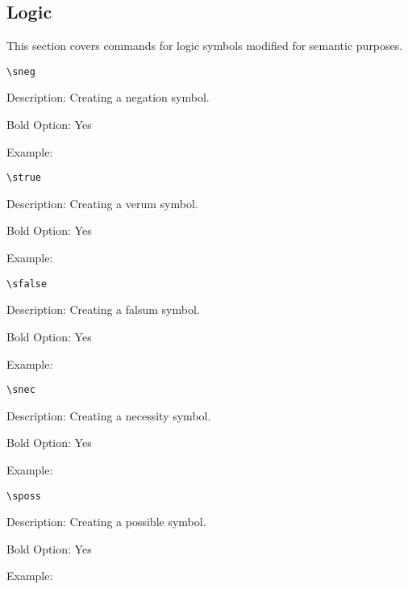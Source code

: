\documentclass[10pt, a4paper]{article}
\newenvironment{itemizeexamplecommand}{
	\begin{itemize}
		\setlength\itemsep{-0.2em}
	}
	{
	\end{itemize}
}
\begin{document}
	\subsection{Logic}
	This section covers commands for logic symbols modified for semantic purposes.
	\pex\begin{itemizeexamplecommand}
			\item[] \begin{lstlisting}[style=B]
			\sneg
			\end{lstlisting}
			{\scriptsize
				\item[] Description: Creating a negation symbol.
				\item[] Bold Option: Yes
				\item[] Example: \sneg}
		\end{itemizeexamplecommand}
	\xe
	\pex\begin{itemizeexamplecommand}
			\item[] \begin{lstlisting}[style=B]
			\strue
			\end{lstlisting}
			{\scriptsize
				\item[] Description: Creating a verum symbol.
				\item[] Bold Option: Yes
				\item[] Example: \strue}
		\end{itemizeexamplecommand}
	\xe
	\pex\begin{itemizeexamplecommand}
			\item[] \begin{lstlisting}[style=B]
			\sfalse
			\end{lstlisting}
			{\scriptsize
				\item[] Description: Creating a falsum symbol.
				\item[] Bold Option: Yes
				\item[] Example: \sfalse}
		\end{itemizeexamplecommand}
	\xe
	\pex\begin{itemizeexamplecommand}
			\item[] \begin{lstlisting}[style=B]
			\snec
			\end{lstlisting}
			{\scriptsize
				\item[] Description: Creating a necessity symbol.
				\item[] Bold Option: Yes
				\item[] Example: \snec}
		\end{itemizeexamplecommand}
	\xe
	\pex\begin{itemizeexamplecommand}
			\item[] \begin{lstlisting}[style=B]
			\sposs
			\end{lstlisting}
			{\scriptsize
				\item[] Description: Creating a possible symbol.
				\item[] Bold Option: Yes
				\item[] Example: \sposs}
		\end{itemizeexamplecommand}
\end{document}
